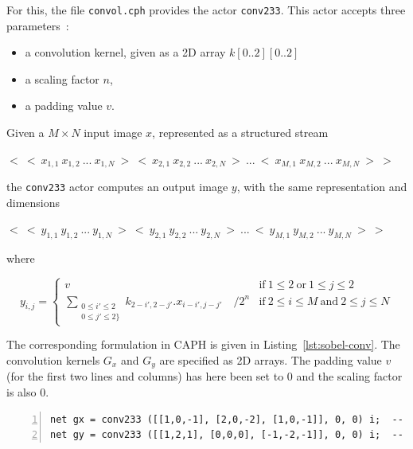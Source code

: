 For this, the file \verb|convol.cph| provides the actor \verb|conv233|. This actor accepts three
parameters~:
\begin{itemize}
\item a convolution kernel, given as a 2D array $k[0..2][0..2]$
\item a scaling factor $n$,
\item a padding value $v$.
\end{itemize}
Given a $M\times N$ input image $x$, represented as a structured stream 

\begin{center}
\begin{math}
<\ <\ x_{1,1}\ x_{1,2}\ ...\ x_{1,N}\ >\ <\ x_{2,1}\ x_{2,2}\ ...\ x_{2,N}\ >\ ...\ <\ x_{M,1}\ x_{M,2}\ ...\ x_{M,N}\ >\ >
\end{math}
\end{center}

\noindent
the \verb|conv233| actor computes an output image $y$, with the same representation and dimensions

\begin{center}
\begin{math}
<\ <\ y_{1,1}\ y_{1,2}\ ...\ y_{1,N}\ >\ <\ y_{2,1}\ y_{2,2}\ ...\ y_{2,N}\ >\ ...\ <\ y_{M,1}\ y_{M,2}\ ...\ y_{M,N}\ >\ >
\end{math}
\end{center}

\noindent
where 

\begin{equation}
y_{i,j} = 
\begin{cases}
v & \text{if}\ 1 \leq 2\ \text{or}\ 1 \leq j \leq 2 \\
\sum\limits_{\substack{0\leq i'\leq 2\\ 0\leq j'\leq 2\}}} k_{2-i',2-j'}.x_{i-i',j-j'}\quad /2^n & \text{if}\ 2\leq i\leq M\ \text{and}\ 2\leq j \leq N
\end{cases}
\label{eq:conv233}
\end{equation}

The corresponding formulation in CAPH is given in Listing~\ref{lst:sobel-conv}. The convolution
kernels $G_x$ and $G_y$ are specified as 2D arrays. The padding value $v$
(for the first two lines and columns) has here been set to 0 and the scaling factor is also 0.

\begin{lstlisting}[style=CaphStyle,numbers=left,numberstyle=\tiny,caption={Computation of the
    gradient components using the \texttt{conv233} actor of the standard CAPH library},label={lst:sobel-conv}]
net gx = conv233 ([[1,0,-1], [2,0,-2], [1,0,-1]], 0, 0) i;  -- grad x component
net gy = conv233 ([[1,2,1], [0,0,0], [-1,-2,-1]], 0, 0) i;  -- grad y component
\end{lstlisting}

